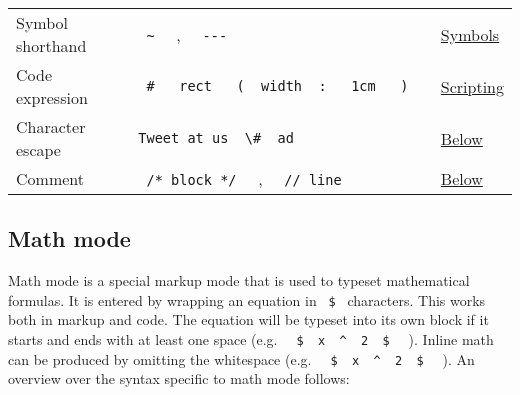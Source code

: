 \begin{longtable}[]{@{}lll@{}}
Symbol shorthand &
\texttt{\ }{\texttt{\ \textasciitilde{}\ }}\texttt{\ } ,
\texttt{\ }{\texttt{\ -\/-\/-\ }}\texttt{\ } &
\href{/docs/reference/symbols/sym/}{Symbols} \\
Code expression &
\texttt{\ }{\texttt{\ \#\ }}\texttt{\ }{\texttt{\ rect\ }}\texttt{\ }{\texttt{\ (\ }}\texttt{\ width\ }{\texttt{\ :\ }}\texttt{\ }{\texttt{\ 1cm\ }}\texttt{\ }{\texttt{\ )\ }}\texttt{\ }
& \href{/docs/reference/scripting/\#expressions}{Scripting} \\
Character escape &
\texttt{\ Tweet\ at\ us\ }{\texttt{\ \textbackslash{}\#\ }}\texttt{\ ad\ }
& \hyperref[escapes]{Below} \\
Comment & \texttt{\ }{\texttt{\ /*\ block\ */\ }}\texttt{\ } ,
\texttt{\ }{\texttt{\ //\ line\ }}\texttt{\ } &
\hyperref[comments]{Below} \\
\end{longtable}

\subsection{Math mode}\label{math}

Math mode is a special markup mode that is used to typeset mathematical
formulas. It is entered by wrapping an equation in \texttt{\ \$\ }
characters. This works both in markup and code. The equation will be
typeset into its own block if it starts and ends with at least one space
(e.g.
\texttt{\ }{\texttt{\ \$\ }}\texttt{\ x\ }{\texttt{\ \^{}\ }}\texttt{\ 2\ }{\texttt{\ \$\ }}\texttt{\ }
). Inline math can be produced by omitting the whitespace (e.g.
\texttt{\ }{\texttt{\ \$\ }}\texttt{\ x\ }{\texttt{\ \^{}\ }}\texttt{\ 2\ }{\texttt{\ \$\ }}\texttt{\ }
). An overview over the syntax specific to math mode follows:

